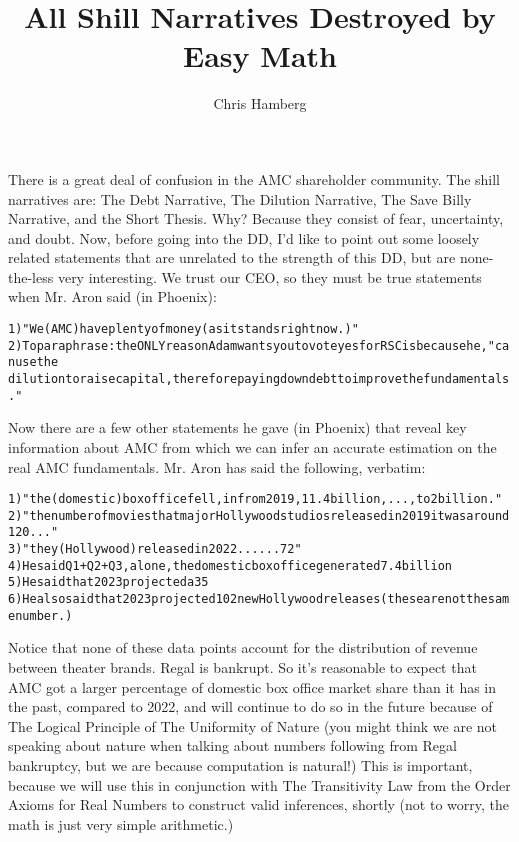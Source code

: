 \documentclass{article}
\title{All Shill Narratives Destroyed by Easy Math}
\author{Chris Hamberg}
\date{}
\begin{document}
\maketitle
\thispagestyle{empty}
There is a great deal of confusion in the AMC shareholder community. The shill 
narratives are: The Debt Narrative, The Dilution Narrative, The Save Billy 
Narrative, and the Short Thesis. Why? Because they consist of fear, uncertainty, 
and doubt. Now, before going into the DD, I'd like to point out some 
loosely related statements that are unrelated to the strength of this DD, but are 
none-the-less very interesting. We trust
our CEO, so they must be true statements when Mr. Aron said (in Phoenix):
\begin{alltt}
1) "We (AMC) have plenty of money (as it stands right now.)"
2) To paraphrase: the ONLY reason Adam wants you to vote yes for RSC is because he, "can use the 
   dilution to raise capital, therefore paying down debt to improve the fundamentals."
\end{alltt}
Now there are a few other statements he gave (in Phoenix) that reveal key 
information about AMC from which we can infer an accurate estimation on the real 
AMC fundamentals. Mr. Aron has said the following, verbatim:
\begin{alltt}
1) "the (domestic) box office fell, in from 2019, 11.4 billion,... , to 2 billion."
2) "the number of movies that major Hollywood studios released in 2019 it was around 120..."
3) "they (Hollywood) released in 2022... ...72"
4) He said Q1 + Q2 + Q3, alone, the domestic box office generated 7.4 billion
5) He said that 2023 projected a 35% increase in Hollywood releases.
6) He also said that 2023 projected 102 new Hollywood releases (these are not the same number.)
\end{alltt}
Notice that none of these data points account for the distribution of 
revenue between theater brands. Regal is bankrupt. So it's reasonable to expect
that AMC got a larger percentage of domestic box office market share than it has 
in the past, compared to 2022, and will continue to do so in the future because of 
The Logical Principle of The Uniformity of Nature (you might think we are not 
speaking about nature when talking about numbers following from Regal bankruptcy, 
but we are because computation is natural!) This is important, 
because we will use this in conjunction with The Transitivity Law from the Order 
Axioms for Real Numbers to construct valid inferences, shortly (not to worry, the 
math is just very simple arithmetic.)
\newline \newline
\end{document}

